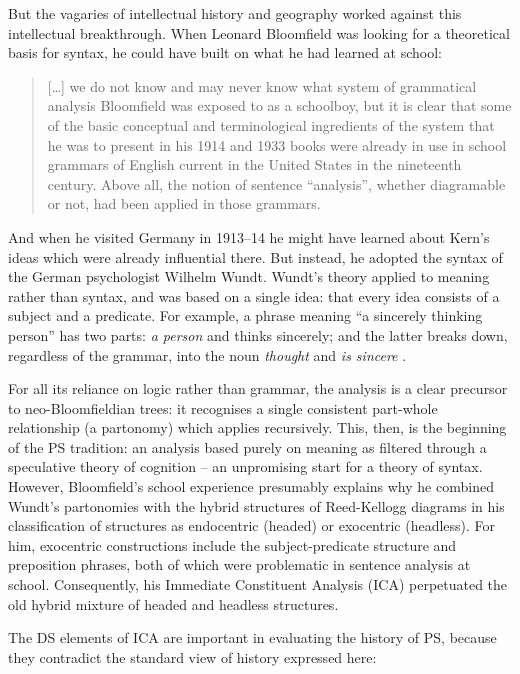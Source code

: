 \documentclass[output=paper]{langscibook}
\begin{document}
But the vagaries of intellectual history and geography worked against this intellectual breakthrough. When Leonard Bloomfield was looking for a theoretical basis for syntax, he could have built on what he had learned at school:

\begin{quotation}
	[\dots] we do not know and may never know what system of grammatical analysis Bloomfield was exposed to as a schoolboy, but it is clear that some of the basic conceptual and terminological ingredients of the system that he was to present in his 1914 and 1933 books were already in use in school grammars of English current in the United States in the nineteenth century. Above all, the notion of sentence ``analysis'', whether diagramable or not, had been applied in those grammars. \citep[18]{Percival1976}
\end{quotation}

And when he visited Germany in 1913--14 he might have learned about Kern’s ideas which were already influential there. But instead, he adopted the syntax of the German psychologist Wilhelm Wundt. Wundt’s theory applied to meaning rather than syntax, and was based on a single idea: that every idea consists of a subject and a predicate. For example, a phrase meaning ``a sincerely thinking person'' has two parts: \emph{a person} and thinks sincerely; and the latter breaks down, regardless of the grammar, into the noun \emph{thought} and \emph{is sincere} \citep{Percival1976}.

For all its reliance on logic rather than grammar, the analysis is a clear precursor to neo-Bloomfieldian trees: it recognises a single consistent part-whole relationship (a partonomy) which applies recursively. This, then, is the beginning of the PS tradition: an analysis based purely on meaning as filtered through a speculative theory of cognition – an unpromising start for a theory of syntax. However, Bloomfield’s school experience presumably explains why he combined Wundt’s partonomies with the hybrid structures of Reed-Kellogg diagrams in his classification of structures as endocentric (headed) or exocentric (headless). For him, exocentric constructions include the subject-predicate structure and preposition phrases, both of which were problematic in sentence analysis at school. Consequently, his Immediate Constituent Analysis (ICA) perpetuated the old hybrid mixture of headed and headless structures.

The DS elements of ICA are important in evaluating the history of PS, because they contradict the standard view of history expressed here:
\end{document}
